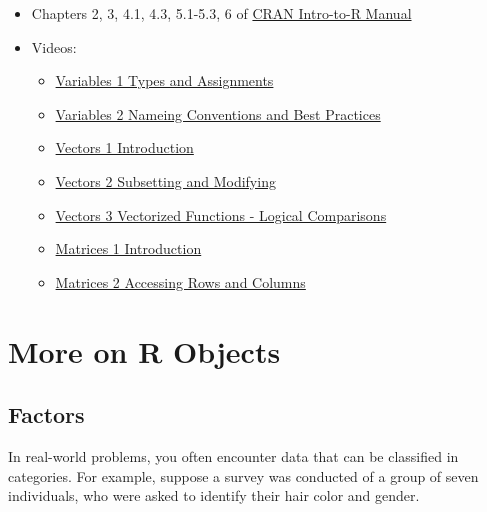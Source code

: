\documentclass[
]{book}
\providecommand{\tightlist}{%
  \setlength{\itemsep}{0pt}\setlength{\parskip}{0pt}}
\begin{document}
\begin{itemize}
\tightlist
\item
  Chapters 2, 3, 4.1, 4.3, 5.1-5.3, 6 of \href{https://cran.r-project.org/doc/manuals/r-release/R-intro.pdf}{CRAN Intro-to-R Manual}
\item
  Videos:

  \begin{itemize}
  \tightlist
  \item
    \href{https://ucr.yuja.com/V/Video?v=2368642\&node=8487537\&a=1529691043\&autoplay=1}{Variables 1 \textbar{} Types and Assignments}
  \item
    \href{https://ucr.yuja.com/V/Video?v=2368641\&node=8487536\&a=957339369\&autoplay=1}{Variables 2 \textbar{} Nameing Conventions and Best Practices}
  \item
    \href{https://ucr.yuja.com/V/Video?v=2368859\&node=8488053\&a=283774152\&autoplay=1}{Vectors 1 \textbar{} Introduction}
  \item
    \href{https://ucr.yuja.com/V/Video?v=2368857\&node=8488051\&a=1465899289\&autoplay=1}{Vectors 2 \textbar Subsetting and Modifying}
  \item
    \href{https://ucr.yuja.com/V/Video?v=2368856\&node=8488050\&a=612212822\&autoplay=1}{Vectors 3 \textbar{} Vectorized Functions - Logical Comparisons}
  \item
    \href{https://ucr.yuja.com/V/Video?v=2368855\&node=8488049\&a=447596964\&autoplay=1}{Matrices 1 \textbar{} Introduction}
  \item
    \href{https://ucr.yuja.com/V/Video?v=2368854\&node=8488047\&a=1529352108\&autoplay=1}{Matrices 2 \textbar{} Accessing Rows and Columns}
  \end{itemize}
\end{itemize}

\hypertarget{more-on-r-objects}{%
\chapter{More on R Objects}\label{more-on-r-objects}}

\hypertarget{factors-1}{%
\section{Factors}\label{factors-1}}

In real-world problems, you often encounter data that can be classified in categories. For example, suppose a survey was conducted of a group of seven individuals, who were asked to identify their hair color and gender.
\end{document}
